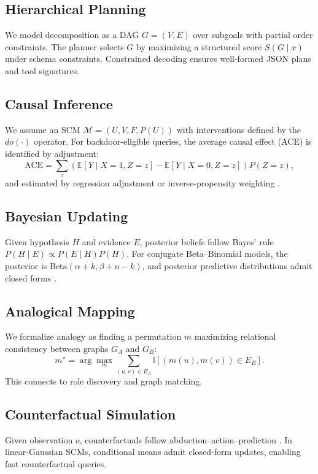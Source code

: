 \documentclass[11pt]{article}
\begin{document}
\subsection{Hierarchical Planning}
We model decomposition as a DAG $G=(V,E)$ over subgoals with partial order constraints. The planner selects $G$ by maximizing a structured score $S(G\mid x)$ under schema constraints. Constrained decoding \citep{anderson2023guidance} ensures well-formed JSON plans and tool signatures.

\subsection{Causal Inference}
We assume an SCM $\mathcal{M}=(U,V,F,P(U))$ with interventions defined by the $do(\cdot)$ operator. For backdoor-eligible queries, the average causal effect (ACE) is identified by adjustment:
\begin{equation}
\mathrm{ACE} = \sum_{z} \left( \mathbb{E}[Y \mid X{=}1,Z{=}z] - \mathbb{E}[Y \mid X{=}0,Z{=}z] \right) P(Z{=}z),
\end{equation}
and estimated by regression adjustment or inverse-propensity weighting \citep{peters2017elements}.

\subsection{Bayesian Updating}
Given hypothesis $H$ and evidence $E$, posterior beliefs follow Bayes' rule $P(H\!\mid\!E)\propto P(E\!\mid\!H)P(H)$. For conjugate Beta--Binomial models, the posterior is $\mathrm{Beta}(\alpha{+}k,\beta{+}n{-}k)$, and posterior predictive distributions admit closed forms \citep{gelman2013bayesian}.

\subsection{Analogical Mapping}
We formalize analogy as finding a permutation $m$ maximizing relational consistency between graphs $G_A$ and $G_B$:
\begin{equation}
m^\star = \arg\max_{m} \sum_{(u,v)\in E_A} \mathbb{I}\!\left[(m(u),m(v))\in E_B\right].
\end{equation}
This connects to role discovery and graph matching.

\subsection{Counterfactual Simulation}
Given observation $o$, counterfactuals follow abduction--action--prediction \citep{pearl2009causality}. In linear-Gaussian SCMs, conditional means admit closed-form updates, enabling fast counterfactual queries.
\end{document}

